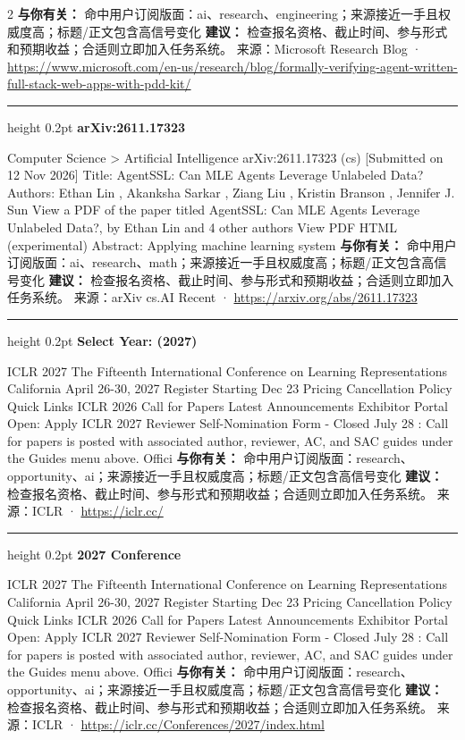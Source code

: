\documentclass[10.5pt]{ctexart}
\begin{document}
\begin{multicols}{2}
\textbf{与你有关：} 命中用户订阅版面：ai、research、engineering；来源接近一手且权威度高；标题/正文包含高信号变化
\textbf{建议：} 检查报名资格、截止时间、参与形式和预期收益；合适则立即加入任务系统。
{\footnotesize\color{ormuted} 来源：Microsoft Research Blog · \url{https://www.microsoft.com/en-us/research/blog/formally-verifying-agent-written-full-stack-web-apps-with-pdd-kit/}}
\vspace{2mm}
\hrule height 0.2pt
\vspace{2mm}
{\large\bfseries arXiv:2611.17323}\par
Computer Science > Artificial Intelligence arXiv:2611.17323 (cs) [Submitted on 12 Nov 2026] Title: AgentSSL: Can MLE Agents Leverage Unlabeled Data? Authors: Ethan Lin , Akanksha Sarkar , Ziang Liu , Kristin Branson , Jennifer J. Sun View a PDF of the paper titled AgentSSL: Can MLE Agents Leverage Unlabeled Data?, by Ethan Lin and 4 other authors View PDF HTML (experimental) Abstract: Applying machine learning system
\textbf{与你有关：} 命中用户订阅版面：ai、research、math；来源接近一手且权威度高；标题/正文包含高信号变化
\textbf{建议：} 检查报名资格、截止时间、参与形式和预期收益；合适则立即加入任务系统。
{\footnotesize\color{ormuted} 来源：arXiv cs.AI Recent · \url{https://arxiv.org/abs/2611.17323}}
\vspace{2mm}
\hrule height 0.2pt
\vspace{2mm}
{\large\bfseries Select Year: (2027)}\par
ICLR 2027 The Fifteenth International Conference on Learning Representations California April 26-30, 2027 Register Starting Dec 23 Pricing Cancellation Policy Quick Links ICLR 2026 Call for Papers Latest Announcements Exhibitor Portal Open: Apply ICLR 2027 Reviewer Self-Nomination Form - Closed July 28 : Call for papers is posted with associated author, reviewer, AC, and SAC guides under the Guides menu above. Offici
\textbf{与你有关：} 命中用户订阅版面：research、opportunity、ai；来源接近一手且权威度高；标题/正文包含高信号变化
\textbf{建议：} 检查报名资格、截止时间、参与形式和预期收益；合适则立即加入任务系统。
{\footnotesize\color{ormuted} 来源：ICLR · \url{https://iclr.cc/}}
\vspace{2mm}
\hrule height 0.2pt
\vspace{2mm}
{\large\bfseries 2027 Conference}\par
ICLR 2027 The Fifteenth International Conference on Learning Representations California April 26-30, 2027 Register Starting Dec 23 Pricing Cancellation Policy Quick Links ICLR 2026 Call for Papers Latest Announcements Exhibitor Portal Open: Apply ICLR 2027 Reviewer Self-Nomination Form - Closed July 28 : Call for papers is posted with associated author, reviewer, AC, and SAC guides under the Guides menu above. Offici
\textbf{与你有关：} 命中用户订阅版面：research、opportunity、ai；来源接近一手且权威度高；标题/正文包含高信号变化
\textbf{建议：} 检查报名资格、截止时间、参与形式和预期收益；合适则立即加入任务系统。
{\footnotesize\color{ormuted} 来源：ICLR · \url{https://iclr.cc/Conferences/2027/index.html}}
\end{multicols}
\end{document}
